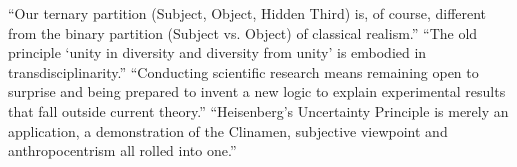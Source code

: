 %
``Our ternary partition (Subject, Object, Hidden Third) is, of course, different from the binary partition (Subject vs. Object) of classical realism.'' \autocite{Nicolescu2010}
%
%
%
%
%
``The old principle `unity in diversity and diversity from unity' is embodied in transdisciplinarity.'' \autocite{Nicolescu2010}
%
%
``Conducting scientific research means remaining open to surprise and being prepared to invent a new logic to explain experimental results that fall outside current theory.'' \autocite{Jarry2006}
%
``Heisenberg’s Uncertainty Principle is merely an application, a demonstration of the Clinamen, subjective viewpoint and anthropocentrism all rolled into one.'' \autocite{Jarry2006}

\stopcontents[chapters]
